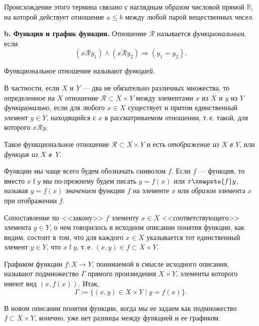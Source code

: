 Происхождение этого термина связано с наглядным образом числовой
прямой $\mathbb{R}$, на которой действует отношение $a \leqslant b$ между любой парой вещественных чисел.

\medskip

\textbf{b. Функция и график функции.} Отношение $\mathscr{R}$ называется \textit{функциональным}, если
\[
  (x \mathrel{\mathscr{R}} y_1) \land (x \mathrel{\mathscr{R}} y_2) \Rightarrow (y_1 = y_2).
\]

Функциональное отношение называют \textit{функцией}.

В частности, если $X$ и $Y$ --- два не обязательно различных множества, то
определенное на $X$ отношение $\mathscr{R} \subset X \times Y$ между элементами $x$ из $X$ и $y$ из $Y$
\textit{функционально}, если для любого $x \in X$ существует и притом единственный
элемент $y \in Y$, находящийся с $x$ в рассматриваемом отношении, т.\,е. такой,
для которого $x \mathrel{\mathscr{R}} y$.

Такое функциональное отношение $\mathscr{R} \subset X \times Y$ и есть \textit{отображение из $X$
в $Y$}, или \textit{функция из $X$ в~$Y$}.

Функции мы чаще всего будем обозначать символом $f$. Если $f$ --- функция,
то вместо $x \mathrel{f} y$ мы по-прежнему будем писать $y = f(x)$ или $x \xmapsto{f} y$, называя $y = f(x)$ \textit{значением} функции $f$ на элементе $x$ или \textit{образом} элемента $x$ при
отображении $f$.

Сопоставление по <<закону>> $f$ элементу $x \in X$ <<соответствующего>> элемента $y \in Y$, о чем говорилось в исходном описании понятия функции, как видим, состоит в том, что для каждого $x \in X$ указывается тот единственный
элемент $y \in Y$, что $x \mathrel{f} y$, т.\,е. $(x, y) \in f \subset X \times Y$.

Графиком функции $f \colon X \to Y$, понимаемой в смысле исходного описания,
называют подмножество $\Gamma$ прямого произведения $X \times Y$, элементы которого
имеют вид $(x, f(x))$. Итак,
\[
  \Gamma := \{(x, y) \in X \times Y \mid y = f(x)\}.
\]

В новом описании понятия функции, когда мы ее задаем как подмножество $f \subset X \times Y$, конечно, уже нет разницы между функцией и ее графиком.

